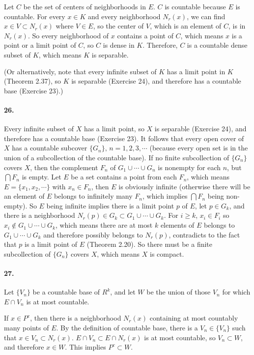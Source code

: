 \documentclass[a4paper]{article}
\begin{document}
Let $C$ be the set of centers of neighborhoods in $E$. $C$ is countable because $E$ is countable. For every $x\in K$ and every neighborhood $N_r(x)$, we can find $x\in V\subset N_r(x)$ where $V\in E$, so the center of $V$, which is an element of $C$, is in $N_r(x)$. So every neighborhood of $x$ contains a point of $C$, which means $x$ is a point or a limit point of $C$, so $C$ is dense in $K$. Therefore, $C$ is a countable dense subset of $K$, which means $K$ is separable.
\medskip

(Or alternatively, note that every infinite subset of $K$ has a limit point in $K$ (Theorem 2.37), so $K$ is separable (Exercise 24), and therefore has a countable base (Exercise 23).)


\paragraph{26.}
Every infinite subset of $X$ has a limit point, so $X$ is separable (Exercise 24), and therefore has a countable base (Exercise 23). It follows that every open cover of $X$ has a countable subcover $\{G_n\},\,n=1,2,3,\cdots$ (because every open set is in the union of a subcollection of the countable base). If no finite subcollection of $\{G_n\}$ covers $X$, then the complement $F_n$ of $G_1\cup\cdots\cup G_n$ is nonempty for each $n$, but $\bigcap F_n$ is empty. Let $E$ be a set contains a point from each $F_n$, which means $E=\{x_1,x_2,\cdots\}$ with $x_n\in F_n$, then $E$ is obviously infinite (otherwise there will be an element of $E$ belongs to infinitely many $F_n$, which implies $\bigcap F_n$ being non-empty). So $E$ being infinite implies there is a limit point $p$ of $E$, let $p\in G_k$, and there is a neighborhood $N_r(p)\in G_k\subset G_1\cup\cdots\cup G_k$. For $i\geq k$, $x_i\in F_i$ so $x_i\not\in G_1\cup\cdots\cup G_k$, which means there are at most $k$ elements of $E$ belongs to $G_1\cup\cdots\cup G_k$ and therefore possibly belongs to $N_r(p)$, contradicts to the fact that $p$ is a limit point of $E$ (Theorem 2.20).  So there must be a finite subcollection of $\{G_n\}$ covers $X$, which means $X$ is compact.

\paragraph{27.}
Let $\{V_n\}$ be a countable base of $R^k$, and let $W$ be the union of those $V_n$ for which $E\cap V_n$ is at most countable.

If $x\in P^c$, then there is a neighborhood $N_r(x)$ containing at most countably many points of $E$. By the definition of countable base,  there is a $V_n\in\{V_n\}$ such that $x\in V_n\subset N_r(x)$. $E\cap V_n\subset E\cap N_r(x)$ is at most countable, so $V_n\subset W$, and therefore $x\in W$. This implies $P^c\subset W$.
\end{document}
